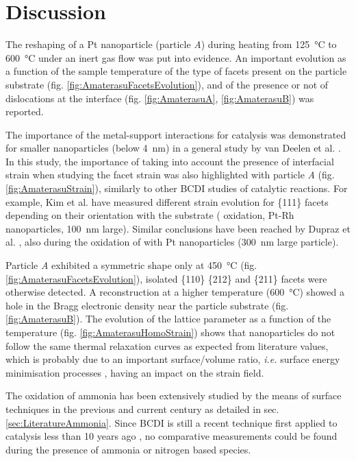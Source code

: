 \section{Discussion}

The reshaping of a Pt nanoparticle (particle \textit{A}) during heating from \qty{125}{\degreeCelsius} to \qty{600}{\degreeCelsius} under an inert gas flow was put into evidence.
An important evolution as a function of the sample temperature of the type of facets present on the particle substrate (fig. \ref{fig:AmaterasuFacetsEvolution}), and of the presence or not of dislocations at the interface (fig. \ref{fig:AmaterasuA}, \ref{fig:AmaterasuB}) was reported.

The importance of the metal-support interactions for catalysis was demonstrated for smaller nanoparticles (below \qty{4}{\nm}) in a general study by van Deelen et al. \parencite*{vanDeelen2019}.
In this study, the importance of taking into account the presence of interfacial strain when studying the facet strain was also highlighted with particle \textit{A} (fig. \ref{fig:AmaterasuStrain}), similarly to other BCDI studies of catalytic reactions.
For example, Kim et al. \parencite*{Kim2021} have measured different strain evolution for \{111\} facets depending on their orientation with the  substrate ( oxidation, Pt-Rh nanoparticles, \qty{100}{\nm} large).
Similar conclusions have been reached by Dupraz et al. \parencite*{Dupraz2022}, also during the oxidation of  with Pt nanoparticles (\qty{300}{\nm} large particle).

Particle \textit{A} exhibited a symmetric shape only at \qty{450}{\degreeCelsius} (fig. \ref{fig:AmaterasuFacetsEvolution}), isolated \{110\} \{212\} and \{211\} facets were otherwise detected.
A reconstruction at a higher temperature (\qty{600}{\degreeCelsius}) showed a hole in the Bragg electronic density near the particle substrate (fig. \ref{fig:AmaterasuB}).
The evolution of the lattice parameter as a function of the temperature (fig. \ref{fig:AmaterasuHomoStrain}) shows that nanoparticles do not follow the same thermal relaxation curves as expected from literature values, which is probably due to an important surface/volume ratio, \textit{i.e.} surface energy minimisation processes \parencite{Winterbottom1967, Boukouvala2021}, having an impact on the strain field.

The oxidation of ammonia has been extensively studied by the means of surface techniques in the previous and current century as detailed in sec. \ref{sec:LiteratureAmmonia}.
Since BCDI is still a recent technique first applied to catalysis less than 10 years ago \parencite{Ulvestad2016}, no comparative measurements could be found during the presence of ammonia or nitrogen based species.

